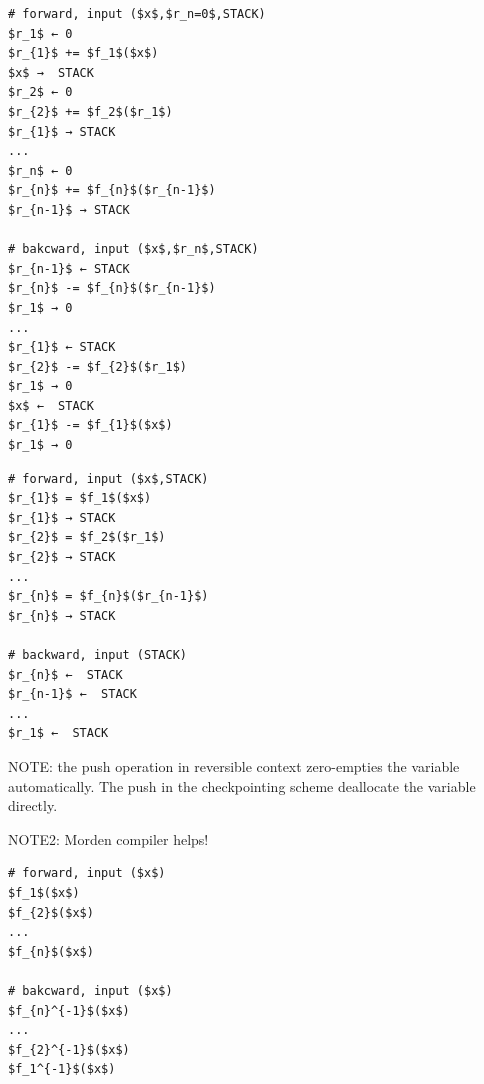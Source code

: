 \documentclass{article}
\newcommand{\<}{\langle}
\renewcommand{\>}{\rangle}
\theoremstyle{definition}\newtheorem{definition}{\textit{Definition}}
\begin{document}
\begin{minipage}{.45\columnwidth}
\begin{lstlisting}[mathescape=true,caption={Reverse computing time efficiently},label={lst:space-efficient}]
# forward, input ($x$,$r_n=0$,STACK)
$r_1$ ← 0
$r_{1}$ += $f_1$($x$)
$x$ →  STACK
$r_2$ ← 0
$r_{2}$ += $f_2$($r_1$)
$r_{1}$ → STACK
...
$r_n$ ← 0
$r_{n}$ += $f_{n}$($r_{n-1}$)
$r_{n-1}$ → STACK

# bakcward, input ($x$,$r_n$,STACK)
$r_{n-1}$ ← STACK
$r_{n}$ -= $f_{n}$($r_{n-1}$)
$r_1$ → 0
...
$r_{1}$ ← STACK
$r_{2}$ -= $f_{2}$($r_1$)
$r_1$ → 0
$x$ ←  STACK
$r_{1}$ -= $f_{1}$($x$)
$r_1$ → 0
\end{lstlisting}
\end{minipage}
\begin{minipage}{.45\columnwidth}
\begin{lstlisting}[mathescape=true,caption={Checkpointing time efficiently},label={lst:checkpointing-time-efficient}]
# forward, input ($x$,STACK)
$r_{1}$ = $f_1$($x$)
$r_{1}$ → STACK
$r_{2}$ = $f_2$($r_1$)
$r_{2}$ → STACK 
...
$r_{n}$ = $f_{n}$($r_{n-1}$)
$r_{n}$ → STACK 

# backward, input (STACK)
$r_{n}$ ←  STACK
$r_{n-1}$ ←  STACK
...
$r_1$ ←  STACK
\end{lstlisting}
\end{minipage}

NOTE: the push operation in reversible context zero-empties the variable automatically. The push in the checkpointing scheme deallocate the variable directly.

NOTE2: Morden compiler helps!

\begin{minipage}{.45\columnwidth}
\begin{lstlisting}[mathescape=true,caption={Reverse computing with reversibility},label={lst:reverse-reversible}]
# forward, input ($x$)
$f_1$($x$)
$f_{2}$($x$)
...
$f_{n}$($x$)

# bakcward, input ($x$)
$f_{n}^{-1}$($x$)
...
$f_{2}^{-1}$($x$)
$f_1^{-1}$($x$)
\end{lstlisting}
\end{minipage}
\end{document}
